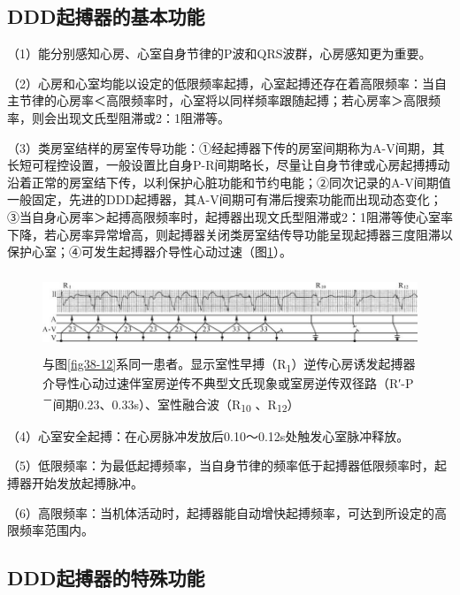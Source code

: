 \protect\hypertarget{text00045.htmlux5cux23subid495}{}{}

\subsection{DDD起搏器的基本功能}

（1）能分别感知心房、心室自身节律的P波和QRS波群，心房感知更为重要。

（2）心房和心室均能以设定的低限频率起搏，心室起搏还存在着高限频率：当自主节律的心房率＜高限频率时，心室将以同样频率跟随起搏；若心房率＞高限频率，则会出现文氏型阻滞或2：1阻滞等。

（3）类房室结样的房室传导功能：①经起搏器下传的房室间期称为A-V间期，其长短可程控设置，一般设置比自身P-R间期略长，尽量让自身节律或心房起搏搏动沿着正常的房室结下传，以利保护心脏功能和节约电能；②同次记录的A-V间期值一般固定，先进的DDD起搏器，其A-V间期可有滞后搜索功能而出现动态变化；③当自身心房率＞起搏高限频率时，起搏器出现文氏型阻滞或2：1阻滞等使心室率下降，若心房率异常增高，则起搏器关闭类房室结传导功能呈现起搏器三度阻滞以保护心室；④可发生起搏器介导性心动过速（图\ref{fig38-27}）。

\begin{figure}[!htbp]
 \centering
 \includegraphics[width=5.80208in,height=0.92708in]{./images/Image00630.jpg}
 \captionsetup{justification=centering}
 \caption{与图\ref{fig38-12}系同一患者。显示室性早搏（R\textsubscript{1}）逆传心房诱发起搏器介导性心动过速伴室房逆传不典型文氏现象或室房逆传双径路（R′-P\textsuperscript{－}间期0.23、0.33s）、室性融合波（R\textsubscript{10} 、R\textsubscript{12}）}
 \label{fig38-27}
  \end{figure} 


（4）心室安全起搏：在心房脉冲发放后0.10～0.12s处触发心室脉冲释放。

（5）低限频率：为最低起搏频率，当自身节律的频率低于起搏器低限频率时，起搏器开始发放起搏脉冲。

（6）高限频率：当机体活动时，起搏器能自动增快起搏频率，可达到所设定的高限频率范围内。

\protect\hypertarget{text00045.htmlux5cux23subid496}{}{}

\subsection{DDD起搏器的特殊功能}

